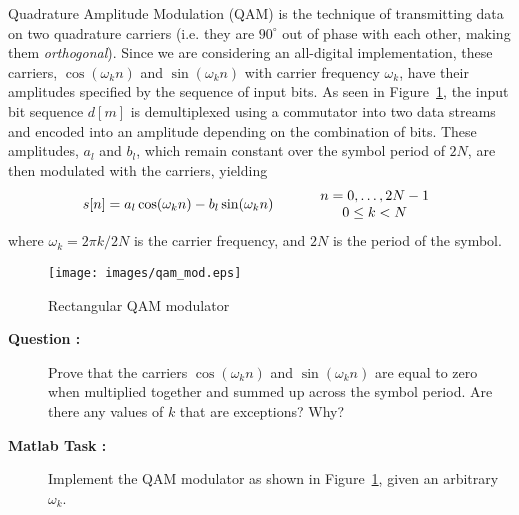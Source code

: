 \documentclass[12pt]{article}
\newcounter{questioncnt}
\newcounter{matlabcnt}
\begin{document}
Quadrature Amplitude Modulation (QAM) is the technique of
transmitting data on two quadrature carriers (i.e. they are
$90^{\circ}$ out of phase with each other, making them {\it
orthogonal}). Since we are considering an all-digital
implementation, these carriers, $\cos(\omega_kn)$ and
$\sin(\omega_kn)$ with carrier frequency $\omega_k$, have their
amplitudes specified by the sequence of input bits. As seen in
Figure~\ref{qam_mod}, the input bit sequence $d[m]$ is
demultiplexed using a commutator into two data streams and encoded
into an amplitude depending on the combination of bits. These
amplitudes, $a_l$ and $b_l$, which remain constant over the symbol
period of $2N$, are then modulated with the carriers, yielding
\begin{equation}\label{basic_qam_defn}
\begin{array}{ccc}
  s[n]=a_l\cos(\omega_kn)-b_l\sin(\omega_kn) & \hspace*{3mm} & \begin{array}{c}
    n=0,\dots,2N-1 \\
    0\le{k}<N \\
  \end{array} \\
\end{array}
\end{equation}
where $\omega_k=2\pi{k}/2N$ is the carrier frequency, and $2N$ is
the period of the symbol.
\begin{figure}[t]
\centering
\texttt{[image: images/qam\_mod.eps]}\\
\caption{Rectangular QAM modulator}\label{qam_mod}
\end{figure}

\begin{description}
    \item[{\bf Question :}]
    Prove that the carriers $\cos(\omega_kn)$ and $\sin(\omega_kn)$ are equal to zero when multiplied together and summed up across the symbol period. Are there any values of $k$ that are exceptions? Why?
\end{description}

\begin{description}
    \item[{\bf Matlab Task :}]
    Implement the QAM modulator as shown in Figure~\ref{qam_mod}, given an arbitrary $\omega_k$.
\end{description}
\end{document}
